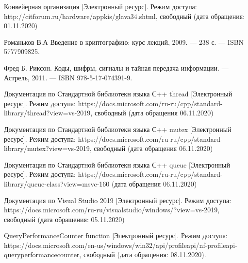 \documentclass[12pt]{report}
\begin{document}
	\begin{thebibliography}{2}
		 Конвейерная организация [Электронный ресурс]. Режим доступа: 
		http://citforum.ru/hardware/appkis/glava34.shtml, 
		свободный (дата обращения: 01.11.2020)
		
		 Романьков В.А Введение в криптографию: курс лекций, 2009. — 238 с. — ISBN 5777909825.
		
		 Фред Б. Риксон. Коды, шифры, сигналы и тайная передача информации. — Астрель, 2011. — ISBN 978-5-17-074391-9.
		
		 Документация по Стандартной библиотекн языка С++ thread [Электронный ресурс]. Режим доступа: https://docs.microsoft.com/ru-ru/cpp/standard-library/thread?view=vs-2019, свободный (дата обращения 06.11.2020)
		
		 Документация по Стандартной библиотекн языка С++ mutex [Электронный ресурс]. Режим доступа: https://docs.microsoft.com/ru-ru/cpp/standard-library/mutex?view=vs-2019, свободный (дата обращения 06.11.2020)
		
		 Документация по Стандартной библиотекн языка С++ queue [Электронный ресурс]. Режим доступа: https://docs.microsoft.com/ru-ru/cpp/standard-library/queue-class?view=msvc-160
		(дата обращения 06.11.2020)
		
		 Документация по Visual Studio 2019 [Электронный ресурс]. Режим доступа: https://docs.microsoft.com/ru-ru/visualstudio/windows/?view=vs-2019, свободный (дата обращения: 05.11.2020)	
		
		 QueryPerformanceCounter function [Электронный ресурс]. Режим доступа: https://docs.microsoft.com/en-us/windows/win32/api/profileapi/nf-profileapi-queryperformancecounter, свободный (дата обращения: 08.11.2020).
	\end{thebibliography}
\end{document}
